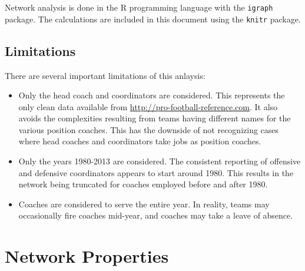 \documentclass{article}\usepackage[]{graphicx}\usepackage[]{color}
\begin{document}
Network analysis is done in the R programming language with the {\tt igraph}
package.  The calculations are included in this document using the {\tt knitr}
package.

\subsection{Limitations}

There are several important limitations of this anlaysis:

\begin{itemize}

\item Only the head coach and coordinators are considered.  This represents the
only clean data available from \url{http://pro-football-reference.com}.  It
also avoids the complexities resulting from teams having different names for
the various position coaches.  This has the downside of not recognizing cases
where head coaches and coordinators take jobs as position coaches.

\item Only the years 1980-2013 are considered.  The consistent reporting of
offensive and defensive coordinators appears to start around 1980.  This
results in the network being truncated for coaches employed before and after
1980.

\item Coaches are considered to serve the entire year.  In reality, teams may
occasionally fire coaches mid-year, and coaches may take a leave of absence.

\end{itemize}

\section{Network Properties}
\end{document}
